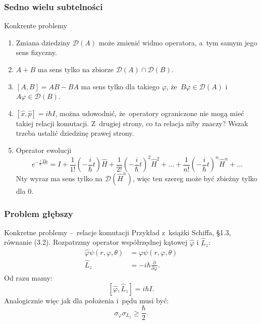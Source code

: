 \documentclass{beamer} \mode<presentation>
\newcommand{\ld}{\ldots}
\newcommand{\fr}{\frac}
\newcommand{\wh}{\widehat}
\newcommand{\mc}{\mathcal}
\newcommand{\vp}{\varphi}
\newcommand{\si}{\sigma}
\newcommand{\D}{\mc{D}}
\newcommand{\pr}{\partial}
\newcommand{\pd}[3]{\fr{ \pr^{ #1 } { #2 } }{ \pr { #3 }^{ #1 } }}
\begin{document}
\begin{frame}
  \frametitle{Sedno wielu subtelności}

  \begin{block}{Konkrente problemy}
    \begin{enumerate}
    \item Zmiana dziedziny $\D( A )$ może zmienić widmo operatora,
      a~tym samym jego sens fizyczny.
    \item $A + B$ ma sens tylko na zbiorze $\D( A ) \cap \D( B )$.
    \item $[ A, B ] = AB - BA$ ma sens tylko dla takiego $\vp$,
      że~$B \vp \in \D( A )$ i~$A \vp \in \D( B )$.
    \item $[ \wh{ x }, \wh{ p } ] = i \hbar I$, można udowodnić,
      że~operatory ograniczone nie mogą mieć takiej relacji komutacji.
      Z~drugiej strony, co ta relacja niby znaczy? Wszak trzeba
      ustalić dziedzinę prawej strony.
    \item Operator ewolucji
      \begin{equation}
        \label{eq:6}
        e^{ -\fr{ i }{ \hbar } \wh{ H } t } = I + \fr{ 1 }{ 1! }
        \left( -\fr{ i }{ \hbar } t \right) \wh{ H } + \fr{ 1 }{ 2! }
        \left( -\fr{ i }{ \hbar } t \right)^{ 2 } \wh{ H }^{ 2 } + \ld
        + \fr{ 1 }{ n! } \left( -\fr{ i }{ \hbar } t \right)^{ n }
        \wh{ H }^{ n } + \ld
      \end{equation}
      N\dywiz ty wyraz ma sens tylko na $\D( \wh{ H }^{ n } )$, więc
      ten szereg może być zbieżny tylko dla $0$.
    \end{enumerate}
  \end{block}
  
\end{frame}


\begin{frame}
  \frametitle{Problem głębszy}


  \begin{block}{Konkretne problemy --~relacje komutacji}
    Przykład z~książki Schiffa, \S 1.3, równanie (3.2). Rozpatrzmy
    operator współrzędnej kątowej $\wh{ \vp }$ i $\wh{ L }_{ z }$:
    \begin{align}
      \label{eq:8}
      \wh{ \vp } \psi( r, \vp, \theta ) &= \vp \psi( r, \vp, \theta ) \\
      \wh{ L }_{ z } &= -i \hbar \pd{}{}{ \vp }.
    \end{align}
    Od razu mamy:
    \begin{equation}
      \label{eq:9}
      [ \wh{ \vp }, \wh{ L }_{ z } ] = i \hbar I.
    \end{equation}
    Analogicznie więc jak dla położenia i~pędu musi być:
    \begin{equation}
      \label{eq:10}
      \si_{ \vp } \si_{ L_{ z } } \geq \fr{ \hbar }{ 2 }.
    \end{equation}
  \end{block}
  
\end{frame}
\end{document}
